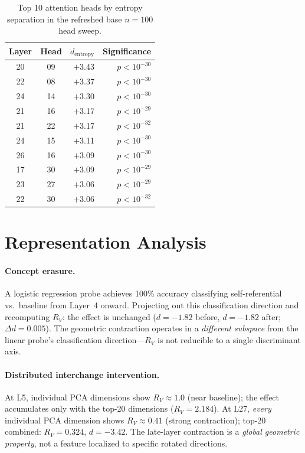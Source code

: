 \documentclass{article}
\newcommand{\RV}{R_V}
\newcommand{\dcohen}{d}
\begin{document}
\begin{table}[h]
\centering
\caption{Top 10 attention heads by entropy separation in the refreshed base $n = 100$ head sweep.}
\small
\begin{tabular}{ccrr}
\toprule
Layer & Head & $\dcohen_\mathrm{entropy}$ & Significance \\
\midrule
20 & 09 & $+$3.43 & $p < 10^{-30}$ \\
22 & 08 & $+$3.37 & $p < 10^{-30}$ \\
24 & 14 & $+$3.30 & $p < 10^{-30}$ \\
21 & 16 & $+$3.17 & $p < 10^{-29}$ \\
21 & 22 & $+$3.17 & $p < 10^{-32}$ \\
24 & 15 & $+$3.11 & $p < 10^{-30}$ \\
26 & 16 & $+$3.09 & $p < 10^{-30}$ \\
17 & 30 & $+$3.09 & $p < 10^{-29}$ \\
23 & 27 & $+$3.06 & $p < 10^{-29}$ \\
22 & 30 & $+$3.06 & $p < 10^{-32}$ \\
\bottomrule
\end{tabular}
\end{table}


\section{Representation Analysis}
\label{app:representation}

\paragraph{Concept erasure.}
A logistic regression probe achieves 100\% accuracy classifying self-referential vs.\ baseline
from Layer~4 onward.
Projecting out this classification direction and recomputing $\RV$: the effect is unchanged
($\dcohen = -1.82$ before, $\dcohen = -1.82$ after; $\Delta d = 0.005$).
The geometric contraction operates in a \emph{different subspace} from the linear probe's
classification direction---$\RV$ is not reducible to a single discriminant axis.

\paragraph{Distributed interchange intervention.}
At L5, individual PCA dimensions show $\RV \approx 1.0$ (near baseline); the effect accumulates
only with the top-20 dimensions ($\RV = 2.184$).
At L27, \emph{every} individual PCA dimension shows $\RV \approx 0.41$ (strong contraction);
top-20 combined: $\RV = 0.324$, $\dcohen = -3.42$.
The late-layer contraction is a \emph{global geometric property}, not a feature localized
to specific rotated directions.
\end{document}
